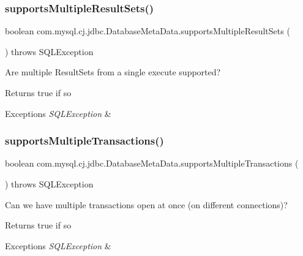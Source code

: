 \subsubsection{\texorpdfstring{supports\+Multiple\+Result\+Sets()}{supportsMultipleResultSets()}}
{\footnotesize\ttfamily boolean com.\+mysql.\+cj.\+jdbc.\+Database\+Meta\+Data.\+supports\+Multiple\+Result\+Sets (\begin{DoxyParamCaption}{ }\end{DoxyParamCaption}) throws S\+Q\+L\+Exception}

Are multiple Result\+Sets from a single execute supported?

\begin{DoxyReturn}{Returns}
true if so 
\end{DoxyReturn}

\begin{DoxyExceptions}{Exceptions}
{\em S\+Q\+L\+Exception} & \\
\hline
\end{DoxyExceptions}
\mbox{\label{classcom_1_1mysql_1_1cj_1_1jdbc_1_1_database_meta_data_a18865768002c7d7527f714e7ebf39f27}} 
\subsubsection{\texorpdfstring{supports\+Multiple\+Transactions()}{supportsMultipleTransactions()}}
{\footnotesize\ttfamily boolean com.\+mysql.\+cj.\+jdbc.\+Database\+Meta\+Data.\+supports\+Multiple\+Transactions (\begin{DoxyParamCaption}{ }\end{DoxyParamCaption}) throws S\+Q\+L\+Exception}

Can we have multiple transactions open at once (on different connections)?

\begin{DoxyReturn}{Returns}
true if so 
\end{DoxyReturn}

\begin{DoxyExceptions}{Exceptions}
{\em S\+Q\+L\+Exception} & \\
\hline
\end{DoxyExceptions}
\mbox{\label{classcom_1_1mysql_1_1cj_1_1jdbc_1_1_database_meta_data_a277857cdcf18defc8af079da8368b0b2}} 
